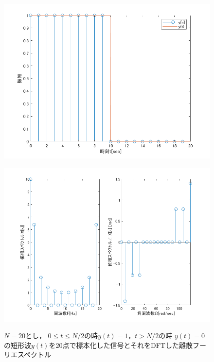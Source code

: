 \documentclass[11pt, a4paper, titlepage]{ltjsarticle}
\begin{document}
\begin{figure}[h]
    \begin{center}
    \begin{minipage}[t]{0.48\columnwidth}
        \includegraphics[width=\columnwidth]{figures/sampling1-A-syusei.png}
        \label{fign:sa1-As}
    \end{minipage}
    \begin{minipage}[t]{0.48\columnwidth}
        \includegraphics[width=\columnwidth]{figures/spectrum1-A.png}
        \label{fign:sp1-A}
    \end{minipage}
    \end{center}
    \caption{$N=20$とし，
$0\leq t \leq N/2$の時$y(t)=1$，$t>N/2$の時
$y(t)=0$の短形波$y(t)$を20点で標本化した信号とそれをDFTした離散フーリエスペクトル}
    \end{figure}
\end{document}
